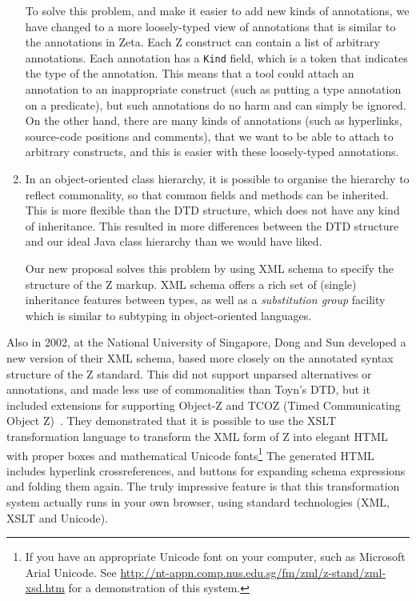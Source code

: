 \documentclass{llncs}  %
\begin{document}
\begin{enumerate}
  To solve this problem, and make it easier to add new kinds of
  annotations, we have changed to a more loosely-typed view of annotations
  that is similar to the annotations in Zeta.  Each Z construct can contain
  a list of arbitrary annotations.  Each annotation has a \verb!Kind!
  field, which is a token that indicates the type of the annotation.  This
  means that a tool could attach an annotation to an inappropriate
  construct (such as putting a type annotation on a predicate), but such
  annotations do no harm and can simply be ignored.  On the other hand,
  there are many kinds of annotations (such as hyperlinks, source-code
  positions and comments), that we want to be able to attach to arbitrary
  constructs, and this is easier with these loosely-typed annotations.
  
\item In an object-oriented class hierarchy, it is possible to organise
  the hierarchy to reflect commonality, so that common fields and methods
  can be inherited.  This is more flexible than the DTD structure, which
  does not have any kind of inheritance.  This resulted in more differences
  between the DTD structure and our ideal Java class hierarchy than we
  would have liked. 

  Our new proposal solves this problem by using XML schema to specify the
  structure of the Z markup.  XML schema offers a rich set of (single)
  inheritance features between types, as well as a \emph{substitution
  group} facility which is similar to subtyping in object-oriented
  languages.  
\end{enumerate}


Also in 2002, at the National University of Singapore, Dong and Sun
developed a new version of their XML schema, based more closely on
the annotated syntax structure of the Z standard.  This did not
support unparsed alternatives or annotations, and made less use of
commonalities than Toyn's DTD, but it included extensions 
for supporting Object-Z and TCOZ (Timed Communicating Object Z)~\cite{md99a}.
They demonstrated that it is possible to use the XSLT transformation
language to transform the XML form of Z into elegant HTML with proper boxes
and mathematical Unicode fonts\footnote{If you have an appropriate Unicode
  font on your computer, such as Microsoft Arial Unicode.  See
  \url{http://nt-appn.comp.nus.edu.sg/fm/zml/z-stand/zml-xsd.htm} for 
  a demonstration of this system.} 
The generated HTML includes hyperlink crossreferences, and buttons for
expanding schema expressions and folding them again.  The truly impressive
feature is that this transformation system actually runs in your own
browser, using standard technologies (XML, XSLT and Unicode).
\end{document}

